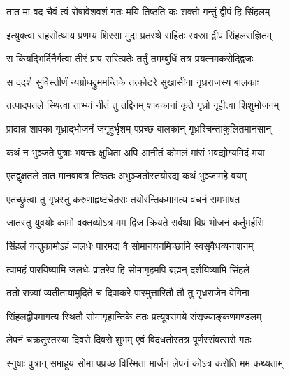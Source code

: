 \twolineshloka
{तात मा वद चैवं त्वं रोषावेशवशं गतः}
{मयि तिष्ठति कः शक्तो गन्तुं द्वीपं हि सिंहलम्} %

\twolineshloka
{इत्युक्त्वा सहसोत्थाय प्रणम्य शिरसा मुदा}
{प्रतस्थे सहितः स्वस्रा द्वीपं सिंहलसंज्ञितम्} %

\twolineshloka
{स कियद्भिर्दिनैर्गत्वा तीरं प्राप सरित्पतेः}
{तर्तुं तमम्बुधिं तत्र प्रयत्नमकरोद्द्विजः} %

\twolineshloka
{स ददर्श सुविस्तीर्णं न्यग्रोधद्रुममन्तिके}
{तत्कोटरे सुखासीना गृध्रराजस्य बालकाः} %

\twolineshloka
{तत्पादपतले स्थित्वा ताभ्यां नीतं तु तद्दिनम्}
{शावकानां कृते गृध्रो गृहीत्वा शिशुभोजनम्} %

\twolineshloka
{प्रादान्न शावका गृध्राद्भोजनं जगृहुर्भृशम्}
{पप्रच्छ बालकान् गृध्रश्चिन्ताकुलितमानसान्} %


\twolineshloka
{कथं न भुञ्जते पुत्राः भवन्तः क्षुधिता अपि}
{आनीतं कोमलं मांसं भवद्योग्यमिदं मया} %


\twolineshloka
{एतद्वृक्षतले तात मानवावत्र तिष्ठतः}
{अभुञ्जतोस्तयोरद्य कथं भुञ्जामहे वयम्} %

\twolineshloka
{एतच्छ्रुत्वा तु गृध्रस्तु करुणाहृष्टचेतसः}
{तयोरन्तिकमागत्य वचनं समभाषत} %


\twolineshloka
{जातस्तु युवयोः कामो वक्तव्योऽत्र मम द्विज}
{क्रियते सर्वथा विप्र भोजनं कर्तुमर्हसि} %


\twolineshloka
{सिंहलं गन्तुकामोऽहं जलधेः पारमद्य वै}
{सोमानयनमिच्छामि स्वसृवैधव्यनाशनम्} %


\twolineshloka
{त्वामहं पारयिष्यामि जलधेः प्रातरेव हि}
{सोमागृहमपि ब्रह्मन् दर्शयिष्यामि सिंहले} %

\twolineshloka
{ततो रात्र्यां व्यतीतायामुदिते च दिवाकरे}
{पारमुत्तारितौ तौ तु गृध्रराजेन वेगिना} %

\twolineshloka
{सिंहलद्वीपमागत्य स्थितौ सोमागृहान्तिके}
{ततः प्रत्यूषसमये संसृज्याङ्कणमण्डलम्} %

\twolineshloka
{लेपनं चक्रतुस्तस्या दिवसे दिवसे शुभम्}
{एवं विदधतोस्तत्र पूर्णस्संवत्सरो गतः} %

\twolineshloka
{स्नुषाः पुत्रान् समाहूय सोमा पप्रच्छ विस्मिता}
{मार्जनं लेपनं कोऽत्र करोति मम कथ्यताम्} %

